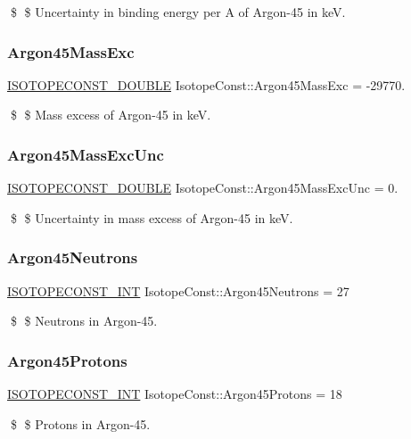 \$ \$ Uncertainty in binding energy per A of Argon-\/45 in keV. \mbox{\label{group___isotope_const-_argon-_ar45_ga8e7de8867473d787d4823b449e958018}} 
\subsubsection{\texorpdfstring{Argon45\+Mass\+Exc}{Argon45MassExc}}
{\footnotesize\ttfamily \mbox{\hyperlink{group___isotope_const-_macros_ga8f45a7272ce02c0b4c65c44636ed719a}{I\+S\+O\+T\+O\+P\+E\+C\+O\+N\+S\+T\+\_\+\+D\+O\+U\+B\+LE}} Isotope\+Const\+::\+Argon45\+Mass\+Exc = -\/29770.}

\$ \$ Mass excess of Argon-\/45 in keV. \mbox{\label{group___isotope_const-_argon-_ar45_ga5c0a7e1770ecb0cf7f91915e51f340ef}} 
\subsubsection{\texorpdfstring{Argon45\+Mass\+Exc\+Unc}{Argon45MassExcUnc}}
{\footnotesize\ttfamily \mbox{\hyperlink{group___isotope_const-_macros_ga8f45a7272ce02c0b4c65c44636ed719a}{I\+S\+O\+T\+O\+P\+E\+C\+O\+N\+S\+T\+\_\+\+D\+O\+U\+B\+LE}} Isotope\+Const\+::\+Argon45\+Mass\+Exc\+Unc = 0.}

\$ \$ Uncertainty in mass excess of Argon-\/45 in keV. \mbox{\label{group___isotope_const-_argon-_ar45_ga2a853ad36c42e0a41dd29a7eeee7a258}} 
\subsubsection{\texorpdfstring{Argon45\+Neutrons}{Argon45Neutrons}}
{\footnotesize\ttfamily \mbox{\hyperlink{group___isotope_const-_macros_ga5f18360b3e99483a35c32d789e62621c}{I\+S\+O\+T\+O\+P\+E\+C\+O\+N\+S\+T\+\_\+\+I\+NT}} Isotope\+Const\+::\+Argon45\+Neutrons = 27}

\$ \$ Neutrons in Argon-\/45. \mbox{\label{group___isotope_const-_argon-_ar45_ga6e569469cd8106332dbb9ee2bba71a92}} 
\subsubsection{\texorpdfstring{Argon45\+Protons}{Argon45Protons}}
{\footnotesize\ttfamily \mbox{\hyperlink{group___isotope_const-_macros_ga5f18360b3e99483a35c32d789e62621c}{I\+S\+O\+T\+O\+P\+E\+C\+O\+N\+S\+T\+\_\+\+I\+NT}} Isotope\+Const\+::\+Argon45\+Protons = 18}

\$ \$ Protons in Argon-\/45. 